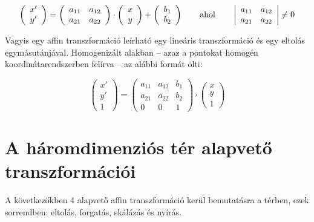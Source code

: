 \[\left(\begin{array}{c}x' \\y'\end{array}\right) = \left(\begin{array}{cc}a_{11} & a_{12}\\a_{21} & a_{22}\\\end{array}\right) \cdot \left(\begin{array}{c}x \\y\end{array}\right) + \left(\begin{array}{c}b_1 \\b_2\end{array}\right) \qquad \hbox{ahol} \qquad  \left|\begin{array}{cc}a_{11} & a_{12}\\a_{21} & a_{22}\\\end{array}\right| \neq 0\]

Vagyis egy affin transzformáció leírható egy lineáris transzformáció és egy eltolás egymásutánjával. Homogenizált alakban -- azaz a pontokat homogén koordinátarendszerben felírva -- az alábbi formát ölti:

\[\left(\begin{array}{c}x' \\y'\\ 1\end{array}\right) = \left(\begin{array}{ccc}a_{11} & a_{12} & b_1\\a_{21} & a_{22} & b_2\\0 & 0 & 1\end{array}\right) \cdot \left(\begin{array}{c}x \\ y\\ 1\end{array}\right)\]

\section{A háromdimenziós tér alapvető transzformációi}

A következőkben 4 alapvető affin transzformáció kerül bemutatásra a térben, ezek sorrendben: eltolás, forgatás, skálázás és nyírás.

